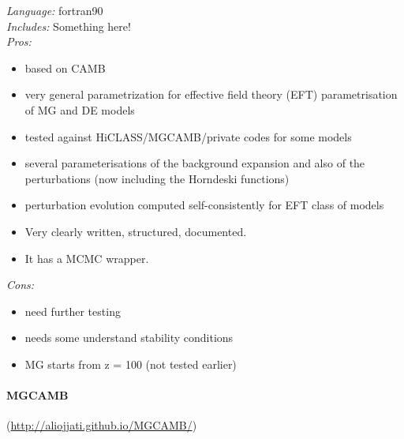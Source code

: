 {\it Language:} fortran90\\
{\it Includes:}
Something here!\\
{\it Pros:}\\ 
\begin{itemize}
 \item based on CAMB
 \item very general parametrization for effective field theory (EFT) parametrisation of MG and DE models
 \item tested against HiCLASS/MGCAMB/private codes for some models
 \item several parameterisations of the background expansion and also of the perturbations (now including the Horndeski functions)
 \item perturbation evolution computed self-consistently for EFT class of models
 \item Very clearly written, structured, documented. 
 \item It has a MCMC wrapper.
\end{itemize}
{\it Cons: }
\begin{itemize}
 \item need further testing
 \item needs some understand stability conditions
 \item MG starts from z = 100 (not tested earlier)
\end{itemize}


\paragraph{MGCAMB}(\url{http://aliojjati.github.io/MGCAMB/})\\

